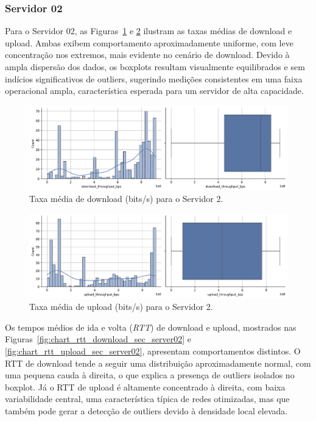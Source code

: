 \documentclass{article}
\begin{document}
\subsubsection{Servidor 02}

Para o Servidor 02, as Figuras~\ref{fig:chart_download_throughput_bps_server02} e \ref{fig:chart_upload_throughput_bps_server02} ilustram as taxas médias de download e upload.  
Ambas exibem comportamento aproximadamente uniforme, com leve concentração nos extremos, mais evidente no cenário de download.  
Devido à ampla dispersão dos dados, os boxplots resultam visualmente equilibrados e sem indícios significativos de outliers, sugerindo medições consistentes em uma faixa operacional ampla, característica esperada para um servidor de alta capacidade.

\begin{figure}[htp]
	\includegraphics[width=\textwidth]{../figures/eda/chart_download_throughput_bps_server02.png}
	\caption{Taxa média de download (bits/s) para o Servidor 2.}
	\label{fig:chart_download_throughput_bps_server02}
\end{figure}

\begin{figure}[htp]
	\includegraphics[width=\textwidth]{../figures/eda/chart_upload_throughput_bps_server02.png}
	\caption{Taxa média de upload (bits/s) para o Servidor 2.}
	\label{fig:chart_upload_throughput_bps_server02}
\end{figure}

Os tempos médios de ida e volta (\textit{RTT}) de download e upload, mostrados nas Figuras~\ref{fig:chart_rtt_download_sec_server02} e \ref{fig:chart_rtt_upload_sec_server02}, apresentam comportamentos distintos.  
O RTT de download tende a seguir uma distribuição aproximadamente normal, com uma pequena cauda à direita, o que explica a presença de outliers isolados no boxplot.  
Já o RTT de upload é altamente concentrado à direita, com baixa variabilidade central, uma característica típica de redes otimizadas, mas que também pode gerar a detecção de outliers devido à densidade local elevada.
\end{document}
